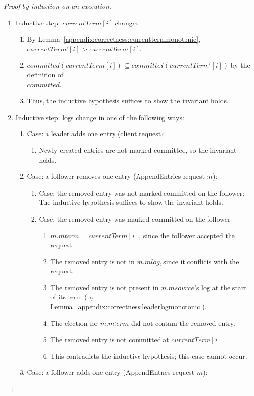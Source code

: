 \begin{proof}[Proof by induction on an execution]
\begin{enumerate}
\item Inductive step: $currentTerm[i]$ changes:
\begin{enumerate}
\item By Lemma~\ref{appendix:correctness:currenttermmonotonic},
$currentTerm'[i] > currentTerm[i]$.
\item $committed(currentTerm[i]) \subseteq
committed(currentTerm'[i])$ by the definition of \\ $committed$.
\item Thus, the inductive hypothesis suffices to show the invariant
holds.
\end{enumerate}

\item Inductive step: logs change in one of the following ways:
\begin{enumerate}
\item Case: a leader adds one entry (client request):
\begin{enumerate}
\item Newly created entries are not marked committed, so the invariant
holds.
\end{enumerate}
\item Case: a follower removes one entry (AppendEntries request $m$):
\begin{enumerate}
\item Case: the removed entry was not marked committed on the follower:
\\ The inductive hypothesis suffices to show the invariant holds.
\item Case: the removed entry was marked committed on the follower:
\begin{enumerate}
\item $m.mterm = currentTerm[i]$, since the follower accepted the
request.
\item The removed entry is not in $m.mlog$, since it conflicts with the
request.
\item The removed entry is not present in $m.msource$'s log at the start
of its term (by Lemma~\ref{appendix:correctness:leaderlogmonotonic}).
\item The election for $m.mterm$ did not contain the removed entry.
\item The removed entry is not committed at $currentTerm[i]$.
\item This contradicts the inductive hypothesis; this case cannot occur.
\end{enumerate}
\end{enumerate}
\item Case: a follower adds one entry (AppendEntries request $m$):

\end{enumerate}
\end{enumerate}
\end{proof}
